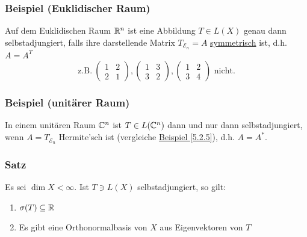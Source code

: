 \subsubsection{Beispiel (Euklidischer Raum)}
Auf dem Euklidischen Raum $\mathbb{R} ^n$ ist eine Abbildung $T\in L(X)$ genau dann selbstadjungiert, falls ihre darstellende Matrix $T_{\mathcal{E}_n}=A$ \underline{symmetrisch} ist, d.h. $A=A^T$
\[\text{z.B.}\ \begin{pmatrix}1 & 2\\ 2 & 1\end{pmatrix},\begin{pmatrix}1 & 3\\ 3 & 2\end{pmatrix}, \begin{pmatrix}1 & 2\\ 3 & 4\end{pmatrix}\text{ nicht.}\]
\subsubsection{Beispiel (unitärer Raum)}
In einem unitären Raum $\mathbb{C} ^n$ ist $T\in L(\mathbb{C} ^n)$ dann und nur dann selbstadjungiert, wenn $A=T_{\mathcal{E}_n}$ Hermite'sch ist (vergleiche \hyperref[5.2.5]{Beispiel \ref{5.2.5}}), d.h. $A=A^*$.
\addtocounter{subsubsection}{1}
\subsubsection{Satz}
Es sei $\dim X<\infty$.  Ist $T\ni L(X)$ selbstadjungiert, so gilt:
\alphabet
\begin{enumerate}
\item $\sigma (T)\subseteq \mathbb{R}$
\item Es gibt eine Orthonormalbasis von $X$ aus Eigenvektoren von $T$
\end{enumerate}
